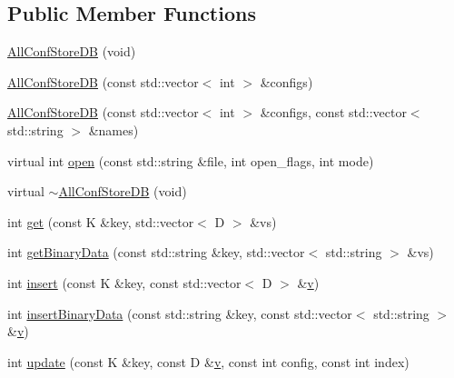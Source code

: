 \subsection*{Public Member Functions}
\begin{DoxyCompactItemize}
\item 
\mbox{\hyperlink{classFILEDB_1_1AllConfStoreDB_a72b72501b29029e2bfb682565f96eac0}{All\+Conf\+Store\+DB}} (void)
\item 
\mbox{\hyperlink{classFILEDB_1_1AllConfStoreDB_a9a8553b0ce3ac82be098130d08f62162}{All\+Conf\+Store\+DB}} (const std\+::vector$<$ int $>$ \&configs)
\item 
\mbox{\hyperlink{classFILEDB_1_1AllConfStoreDB_ab8b213578395f0ac7d436a82f4a26fe1}{All\+Conf\+Store\+DB}} (const std\+::vector$<$ int $>$ \&configs, const std\+::vector$<$ std\+::string $>$ \&names)
\item 
virtual int \mbox{\hyperlink{classFILEDB_1_1AllConfStoreDB_aa6e6deb3c33076d16db4ac0560f0d75f}{open}} (const std\+::string \&file, int open\+\_\+flags, int mode)
\item 
virtual \mbox{\hyperlink{classFILEDB_1_1AllConfStoreDB_ac5fe65eab60f20d7b8124c69c0bd5923}{$\sim$\+All\+Conf\+Store\+DB}} (void)
\item 
int \mbox{\hyperlink{classFILEDB_1_1AllConfStoreDB_a848466f7dce25cacc4e8560c50240d35}{get}} (const K \&key, std\+::vector$<$ D $>$ \&vs)
\item 
int \mbox{\hyperlink{classFILEDB_1_1AllConfStoreDB_aa923faf368f0aa7d327c2a3702d261c1}{get\+Binary\+Data}} (const std\+::string \&key, std\+::vector$<$ std\+::string $>$ \&vs)
\item 
int \mbox{\hyperlink{classFILEDB_1_1AllConfStoreDB_abf4a1ccd7306de436ba1ec61b242e02f}{insert}} (const K \&key, const std\+::vector$<$ D $>$ \&\mbox{\hyperlink{adat__devel_2lib_2hadron_2hadron__timeslice_8cc_a716fc87f5e814be3ceee2405ed6ff22a}{v}})
\item 
int \mbox{\hyperlink{classFILEDB_1_1AllConfStoreDB_ac2c898624d4b32c526951edfb6271d60}{insert\+Binary\+Data}} (const std\+::string \&key, const std\+::vector$<$ std\+::string $>$ \&\mbox{\hyperlink{adat__devel_2lib_2hadron_2hadron__timeslice_8cc_a716fc87f5e814be3ceee2405ed6ff22a}{v}})
\item 
int \mbox{\hyperlink{classFILEDB_1_1AllConfStoreDB_a3beaa117f0ddf32de13d5f96643b626c}{update}} (const K \&key, const D \&\mbox{\hyperlink{adat__devel_2lib_2hadron_2hadron__timeslice_8cc_a716fc87f5e814be3ceee2405ed6ff22a}{v}}, const int config, const int index)
\item 

\end{DoxyCompactItemize}
